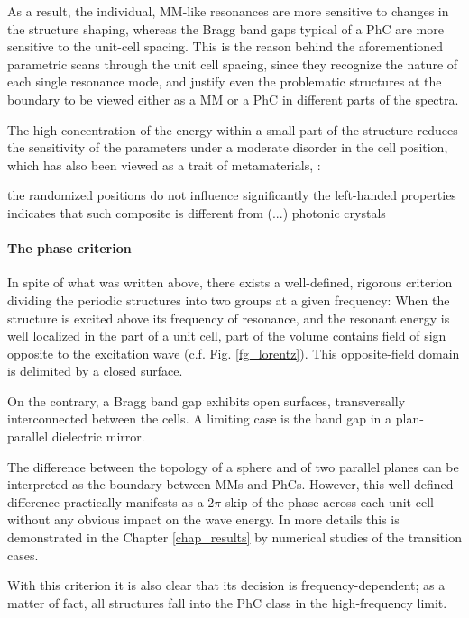 As a result, the individual, MM-like resonances are more sensitive to changes in the structure shaping, whereas the Bragg band gaps typical of a PhC are more sensitive to the unit-cell spacing. This is the reason behind the aforementioned parametric scans \cite{shi2007,rybin2015,dominec2014transition} through the unit cell spacing, %
since they recognize the nature of each single resonance mode, and justify even the problematic structures at the boundary to be viewed either as a MM or a PhC in different parts of the spectra.

The high concentration of the energy within a small part of the structure reduces the sensitivity of the parameters under a moderate disorder in the cell position, which has also been viewed as a trait of metamaterials, \cite{peng2007}: 
\begin{displayquote}
the randomized positions do not influence significantly the left-handed properties indicates that such composite is different from (...) photonic crystals
\end{displayquote}

\paragraph{The phase criterion} %
In spite of what was written above, there exists a well-defined, rigorous criterion dividing the periodic structures into two groups at a given frequency: When the structure is excited above its frequency of resonance, and the resonant energy is well localized in the part of a unit cell, part of the volume contains field of sign opposite to the excitation wave (c.f. Fig. \ref{fg_lorentz}). %
This opposite-field domain is delimited by a closed surface.

On the contrary, a Bragg band gap exhibits open surfaces, transversally interconnected between the cells. A limiting case is the band gap in a plan-parallel dielectric mirror.

The difference between the topology of a sphere and of two parallel planes can be interpreted as the boundary between MMs and PhCs. However, this well-defined difference practically manifests as a $2\pi$-skip of the phase across each unit cell without any obvious impact on the wave energy. In more details this is demonstrated in the Chapter \ref{chap_results} %
by numerical studies of the transition cases.

With this criterion it is also clear that its decision is frequency-dependent; as a matter of fact, all structures fall into the PhC class in the high-frequency limit.


